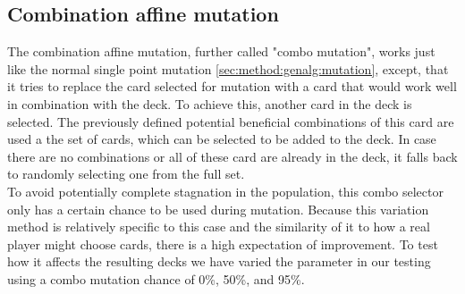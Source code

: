 \subsection{Combination affine mutation}
\label{sec:method:genalg:combo_mutation}
The combination affine mutation, further called "combo mutation", works just like the normal single point mutation \ref{sec:method:genalg:mutation}, except, that it tries to replace the card selected for mutation with a card that would work well in combination with the deck. To achieve this, another card in the deck is selected. The previously defined potential beneficial combinations of this card are used a the set of cards, which can be selected to be added to the deck. In case there are no combinations or all of these card are already in the deck, it falls back to randomly selecting one from the full set.\\
To avoid potentially complete stagnation in the population, this combo selector only has a certain chance to be used during mutation. Because this variation method is relatively specific to this case and the similarity of it to how a real player might choose cards, there is a high expectation of improvement. To test how it affects the resulting decks we have varied the parameter in our testing using a combo mutation chance of 0\%, 50\%, and 95\%.

